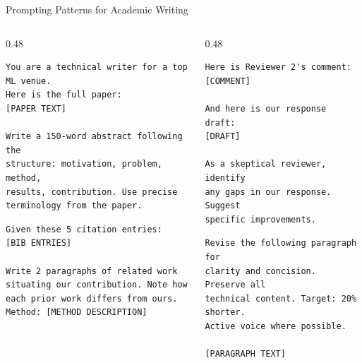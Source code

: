 \begin{frame}[fragile]{Prompting Patterns for Academic Writing}
  \begin{columns}[T, onlytextwidth]
    \begin{column}{0.48\textwidth}
      \begin{lstlisting}[language={}, numbers=none, basicstyle=\ttfamily\scriptsize,
                         caption={Abstract generation}]
You are a technical writer for a top ML venue.
Here is the full paper:
[PAPER TEXT]

Write a 150-word abstract following the
structure: motivation, problem, method,
results, contribution. Use precise
terminology from the paper.
      \end{lstlisting}
      \vspace{0.3em}
      \begin{lstlisting}[language={}, numbers=none, basicstyle=\ttfamily\scriptsize,
                         caption={Related work expansion}]
Given these 5 citation entries:
[BIB ENTRIES]

Write 2 paragraphs of related work
situating our contribution. Note how
each prior work differs from ours.
Method: [METHOD DESCRIPTION]
      \end{lstlisting}
    \end{column}
    \hfill
    \begin{column}{0.48\textwidth}
      \begin{lstlisting}[language={}, numbers=none, basicstyle=\ttfamily\scriptsize,
                         caption={Reviewer response}]
Here is Reviewer 2's comment:
[COMMENT]

And here is our response draft:
[DRAFT]

As a skeptical reviewer, identify
any gaps in our response. Suggest
specific improvements.
      \end{lstlisting}
      \vspace{0.3em}
      \begin{lstlisting}[language={}, numbers=none, basicstyle=\ttfamily\scriptsize,
                         caption={Clarity editing}]
Revise the following paragraph for
clarity and concision. Preserve all
technical content. Target: 20% shorter.
Active voice where possible.

[PARAGRAPH TEXT]
      \end{lstlisting}
    \end{column}
  \end{columns}
\end{frame}

